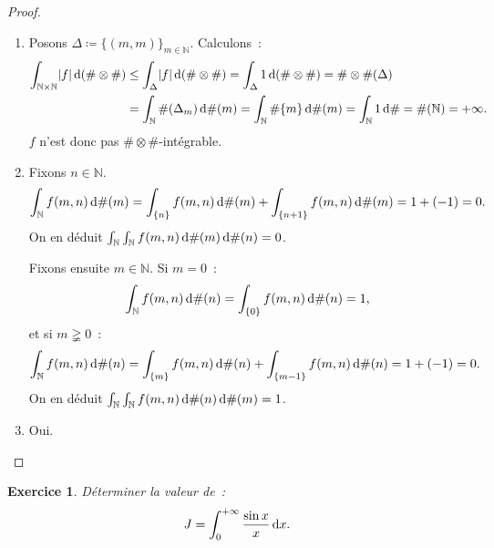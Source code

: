 \documentclass{article}
\newtheorem{ex}{Exercice}[section]
\theoremstyle{definition}
\newcommand{\pinfty}{{+\infty}}
\newcommand{\N}{{\mathbb N}}
\begin{document}
\begin{proof}~
\begin{enumerate}
	\item Posons $\Delta \coloneqq \{(m, m)\}_{m \in \N}$. Calculons~:
	\begin{align*}
		\int_{\N \times \N}\abs f\dif\,(\# \otimes \#) &\leq \int_\Delta\abs f\dif\,(\# \otimes \#) = \int_\Delta 1 \dif\,(\# \otimes \#) = \# \otimes \#(\Delta) \\
			&= \int_\N\#(\Delta_m)\dif\#(m) = \int_\N\#\{m\}\dif\#(m) = \int_\N1\dif\# = \#(\N) = \pinfty.
	\end{align*}
	$f$ n'est donc pas $\# \otimes \#$-intégrable.

	\item Fixons $n \in \N$.
	\[\int_\N f(m, n)\dif\#(m) = \int_{\{n\}}f(m, n)\dif\#(m) + \int_{\{n+1\}}f(m, n)\dif\#(m) = 1 + (-1) = 0.\]
	On en déduit $\int_\N\int_\N f(m,n)\dif\#(m)\dif\#(n) = 0$.

	Fixons ensuite $m \in \N$. Si $m = 0$~:
	\[\int_\N f(m, n)\dif\#(n) = \int_{\{0\}}f(m, n)\dif\#(n) = 1,\]
	et si $m \gneqq 0$~:
	\[\int_\N f(m, n)\dif\#(n) = \int_{\{m\}}f(m, n)\dif\#(n) + \int_{\{m-1\}}f(m, n)\dif\#(n) = 1 + (-1) = 0.\]
	On en déduit $\int_\N\int_\N f(m, n)\dif\#(n)\dif\#(m) = 1$.

	\item Oui.
\end{enumerate}
\end{proof}

\begin{ex} Déterminer la valeur de~:
\[J = \int_0^\pinfty\frac {\sin x}x\dif x.\]
\end{ex}
\end{document}

